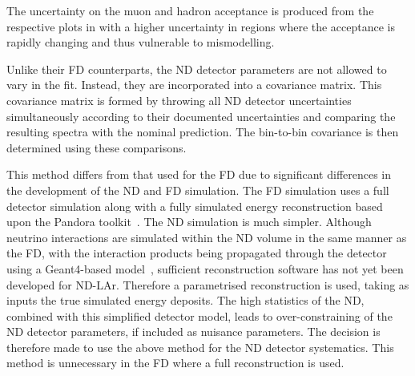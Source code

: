 The uncertainty on the muon and hadron acceptance is produced from the respective plots in  with a higher uncertainty in regions where the acceptance is rapidly changing and thus vulnerable to mismodelling.

Unlike their FD counterparts, the ND detector parameters are not allowed to vary in the fit.
Instead, they are incorporated into a covariance matrix.
This covariance matrix is formed by throwing all ND detector uncertainties simultaneously according to their documented uncertainties and comparing the resulting spectra with the nominal prediction.
The bin-to-bin covariance is then determined using these comparisons.

This method differs from that used for the FD due to significant differences in the development of the ND and FD simulation.
The FD simulation uses a full detector simulation along with a fully simulated energy reconstruction based upon the Pandora toolkit~\cite{pandora}.
The ND simulation is much simpler. 
Although neutrino interactions are simulated within the ND volume in the same manner as the FD, with the interaction products being propagated through the detector using a Geant4-based model~\cite{geant}, sufficient reconstruction software has not yet been developed for ND-LAr.
Therefore a parametrised reconstruction is used, taking as inputs the true simulated energy deposits.
The high statistics of the ND, combined with this simplified detector model, leads to over-constraining of the ND detector parameters, if included as nuisance parameters.
The decision is therefore made to use the above method for the ND detector systematics.
This method is unnecessary in the FD where a full reconstruction is used.

